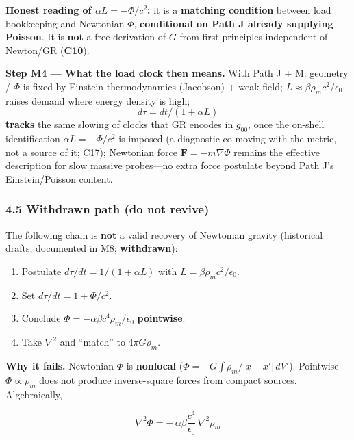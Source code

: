 \documentclass[
  11pt,
]{article}
\providecommand{\tightlist}{%
  \setlength{\itemsep}{0pt}\setlength{\parskip}{0pt}}
\begin{document}
\textbf{Honest reading of \(\alpha L=-\Phi/c^2\):} it is a
\textbf{matching condition} between load bookkeeping and Newtonian
\(\Phi\), \textbf{conditional on Path J already supplying Poisson}. It
is \textbf{not} a free derivation of \(G\) from first principles
independent of Newton/GR (\textbf{C10}).

\textbf{Step M4 --- What the load clock then means.} With Path J + M:
geometry / \(\Phi\) is fixed by Einstein thermodynamics (Jacobson) +
weak field; \(L\approx\beta\rho_m c^2/\epsilon_0\) raises demand where
energy density is high; \[d\tau=dt/(1+\alpha L)\] \textbf{tracks} the
same slowing of clocks that GR encodes in \(g_{00}\), once the on-shell identification
\(\alpha L=-\Phi/c^2\) is imposed (a diagnostic co-moving with the metric,
not a source of it; C17); Newtonian force
\(\mathbf{F}=-m\nabla\Phi\) remains the effective description for slow
massive probes---no extra force postulate beyond Path J's
Einstein/Poisson content.

\subsubsection{4.5 Withdrawn path (do not
revive)}\label{withdrawn-path-do-not-revive}

The following chain is \textbf{not} a valid recovery of Newtonian
gravity (historical drafts; documented in M8; \textbf{withdrawn}):

\begin{enumerate}
\def\labelenumi{\arabic{enumi}.}
\tightlist
\item
  Postulate \(d\tau/dt=1/(1+\alpha L)\) with
  \(L=\beta\rho_m c^2/\epsilon_0\).\\
\item
  Set \(d\tau/dt=1+\Phi/c^2\).\\
\item
  Conclude \(\Phi=-\alpha\beta c^4\rho_m/\epsilon_0\)
  \textbf{pointwise}.\\
\item
  Take \(\nabla^2\) and ``match'' to \(4\pi G\rho_m\).
\end{enumerate}

\textbf{Why it fails.} Newtonian \(\Phi\) is \textbf{nonlocal}
(\(\Phi=-G\int\rho_m/|x-x'|\,dV'\)). Pointwise \(\Phi\propto\rho_m\)
does not produce inverse-square forces from compact sources.
Algebraically,

\[
\nabla^2\Phi
=
-\,\alpha\beta\frac{c^4}{\epsilon_0}\,\nabla^2\rho_m
\]
\end{document}
